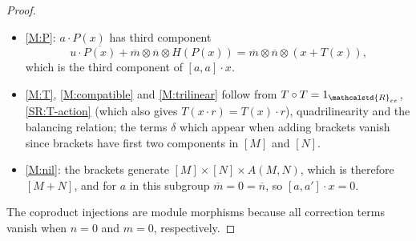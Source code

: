 \documentclass[reqno,a4paper]{amsart}
\theoremstyle{plain}
\theoremstyle{definition}
\newcommand{\R}{\ensuremath{\mathcalstd{R}}}
\newcommand{\Ree}{\ensuremath{\R_{ee}}}
\newcommand{\brk}[2]{\ensuremath{[#1,#2]}}
\begin{document}
\begin{proof}
\begin{itemize}
\begin{align*}
          \end{align*}
          by~\ref{SR:H-product}, \ref{SR:right-distributivity}, \ref{SR:H-sum}, \ref{SR:P-kills} and \ref{SR:T}.
    \item \ref{M:P}: \(a\cdot P(x)\) has third component
          \[
            u\cdot\overline{P(x)}+\overline{m}\otimes\overline{n}\otimes H(P(x))=\overline{m}\otimes\overline{n}\otimes(x+T(x))\text{,}
          \]
          which is the third component of \(\brk{a}{a}\cdot x\).
    \item \ref{M:T}, \ref{M:compatible} and \ref{M:trilinear} follow from \(T\circ T=1_{\Ree}\), \ref{SR:T-action} (which also gives \(T(x\cdot r)=T(x)\cdot r\)), quadrilinearity and the balancing relation; the terms \(\delta\) which appear when adding brackets vanish since brackets have first two components in \([M]\) and \([N]\).
    \item \ref{M:nil}: the brackets generate \([M]\times[N]\times A(M,N)\), which is therefore \([M+N]\), and for \(a\) in this subgroup \(\overline{m}=0=\overline{n}\), so \(\brk{a}{a'}\cdot x=0\).
  \end{itemize}
  The coproduct injections are module morphisms because all correction terms vanish when \(n=0\) and \(m=0\), respectively.


\end{proof}
\end{document}
